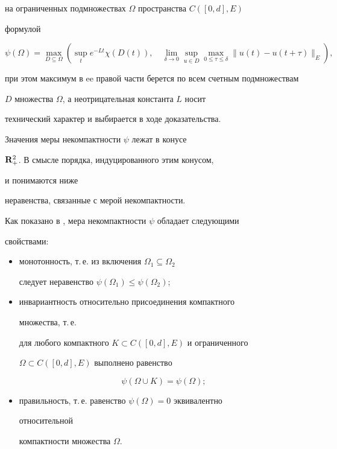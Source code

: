 на ограниченных подмножествах $\Omega$ пространства $C([0,d],E)$


формулой


$$


\psi (\Omega)= \max_{D\subseteq\Omega}(\sup_{t} e^{-Lt} \chi (D(t)),


\quad \lim_{\delta \to 0}


\sup_{u\in D}\max_{0\le\tau\le\delta }\| u(t)-u(t+\tau)\|_E),


$$


при этом максимум в ee правой части берется по всем счетным подмножествам


$D$ множества $\Omega$, а неотрицательная константа $L$ носит


технический характер и выбирается в ходе доказательства.


Значения меры некомпактности $\psi$ лежат в конусе 


$\bold R^2_+$. В смысле порядка, индуцированного этим конусом,


и понимаются ниже


неравенства, связанные с мерой некомпактности.





Как показано в \cite{6}, мера некомпактности $\psi$ обладает следующими


свойствами:


\begin{itemize}


\item[1)] монотонность, т.\,е. из включения $\Omega_1\subseteq \Omega_2$ 


следует неравенство $\psi(\Omega_1)\leq \psi(\Omega_2);$ 


\item[2)] инвариантность относительно присоединения компактного


множества, т.\,е.


для любого компактного $K\subset C([0,d],E)$ и ограниченного 


$\Omega\subset C([0,d],E)$ выполнено равенство


$$


\psi (\Omega\cup K)=\psi (\Omega);


$$


\item[3)] правильность, т.\,е. равенство $\psi (\Omega)=0$ эквивалентно 


относительной


компактности множества $\Omega$.


\end{itemize}





